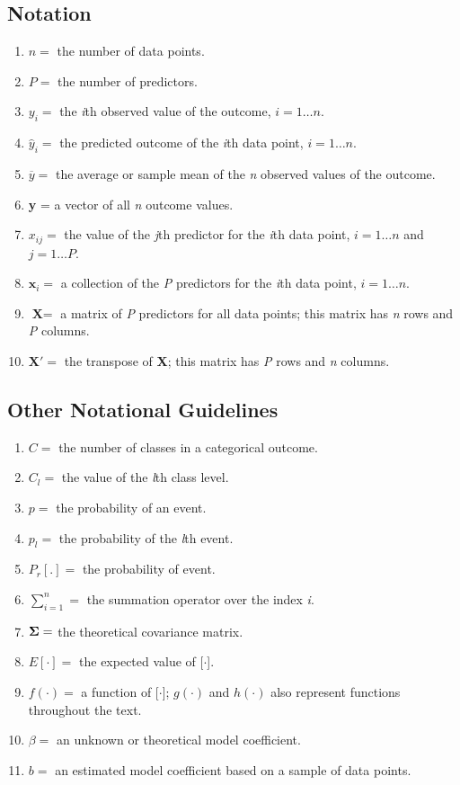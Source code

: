 \documentclass[../main.tex]{subfiles}
\begin{document}
\subsection{Notation}
\begin{enumerate}
    \item $ n = $ the number of data points.
    \item $ P = $ the number of predictors.
    \item $ y_i = $ the \textit{i}th observed value of the outcome, $ i=1\dots n $.
    \item $ \hat{y}_i = $ the predicted outcome of the \textit{i}th data point, $ i=1\dots n $.
    \item $ \overline{y} = $ the average or sample mean of the \textit{n} observed values of the outcome.
    \item \textbf{y} = a vector of all \textit{n} outcome values.
    \item $ x_{ij} =  $ the value of the \textit{j}th predictor for the \textit{i}th data point, $ i=1\dots n $ and $ j=1\dots P $.
    \item $ \textbf{x}_i = $ a collection of the \textit{P} predictors for the \textit{i}th data point, $ i=1\dots n $.
    \item $ \textbf{X} = $ a matrix of \textit{P} predictors for all data points; this matrix has \textit{n} rows and \textit{P} columns.
    \item $ \textbf{X}' = $ the transpose of \textbf{X}; this matrix has \textit{P} rows and \textit{n} columns.
\end{enumerate}
\subsection{Other Notational Guidelines}
\begin{enumerate}
    \item $ C = $ the number of classes in a categorical outcome.
    \item $ C_l = $ the value of the \textit{l}th class level.
    \item $ p = $ the probability of an event.
    \item $ p_l = $ the probability of the \textit{l}th event.
    \item $ P_r[.] =  $ the probability of event.
    \item $ \sum_{i=1}^{n} = $ the summation operator over the index \textit{i}.
    \item $ \bf{\Sigma} = $ the theoretical covariance matrix.
    \item $ E[\cdot] = $ the expected value of [$ \cdot $].
    \item $ f(\cdot) = $ a function of [$ \cdot $]; $ g(\cdot) $ and $ h(\cdot) $ also represent functions throughout the text.
    \item $ \beta = $ an unknown or theoretical model coefficient.
    \item $ b = $ an estimated model coefficient based on a sample of data points.
\end{enumerate}
\end{document}
